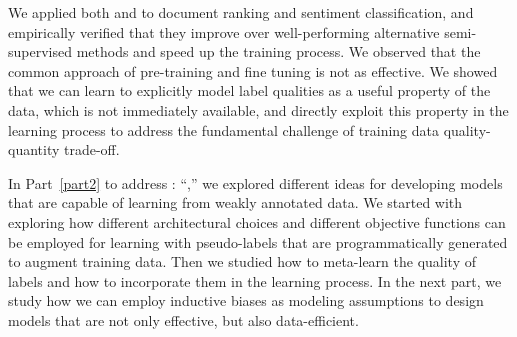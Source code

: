 We applied both \cws and \fwl to document ranking and sentiment classification, and empirically verified that they improve over well-performing alternative semi-supervised methods and speed up the training process. We observed that the common approach of pre-training and fine tuning is not as effective. We showed that we can learn to explicitly model label qualities as a useful property of the data, which is not immediately available, and directly exploit this property in the learning process to address the fundamental challenge of training data quality-quantity trade-off. 


\bigskip
In Part~\ref{part2} to address \textbf{}: ``\emph{},'' we explored different ideas for developing models that are capable of learning from weakly annotated data. We started with exploring how different architectural choices and different objective functions can be employed for learning with pseudo-labels that are programmatically generated to augment training data. Then we studied how to meta-learn the quality of labels and how to incorporate them in the learning process.
%
In the next part, we study how we can employ inductive biases as modeling assumptions to design models that are not only effective, but also data-efficient.
